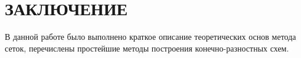 \section*{ЗАКЛЮЧЕНИЕ}

В данной работе было выполнено краткое описание теоретических основ метода сеток,
перечислены простейшие методы построения конечно-разностных схем.